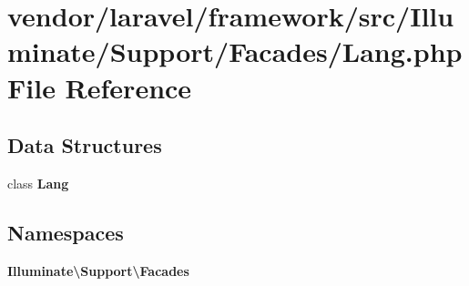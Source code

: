 \section{vendor/laravel/framework/src/\+Illuminate/\+Support/\+Facades/\+Lang.php File Reference}
\label{_lang_8php}
\subsection*{Data Structures}
\begin{DoxyCompactItemize}
\item 
class {\bf Lang}
\end{DoxyCompactItemize}
\subsection*{Namespaces}
\begin{DoxyCompactItemize}
\item 
 {\bf Illuminate\textbackslash{}\+Support\textbackslash{}\+Facades}
\end{DoxyCompactItemize}
